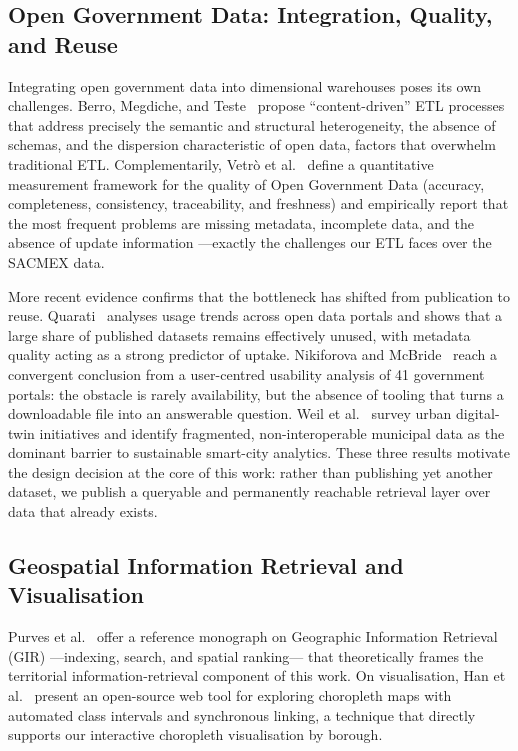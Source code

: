\documentclass[runningheads]{llncs}
\renewcommand{\_}{\origunderscore\allowbreak}
\newif\ifshowchanges
\newcommand{\new}[1]{\ifshowchanges\textcolor{chg}{#1}\else#1\fi}
\begin{document}
\subsection{Open Government Data: Integration, Quality, and Reuse}

Integrating open government data into dimensional warehouses poses its own
challenges. Berro, Megdiche, and Teste~\cite{berro2015} propose
``content-driven'' ETL processes that address precisely the semantic and
structural heterogeneity, the absence of schemas, and the dispersion
characteristic of open data, factors that overwhelm traditional ETL.
Complementarily, Vetr\`o et al.~\cite{vetro2016} define a quantitative
measurement framework for the quality of Open Government Data (accuracy,
completeness, consistency, traceability, and freshness) and empirically report
that the most frequent problems are missing metadata, incomplete data, and the
absence of update information ---exactly the challenges our ETL faces over the
SACMEX data.

\new{More recent evidence confirms that the bottleneck has shifted from
publication to reuse. Quarati~\cite{quarati2023} analyses usage trends across
open data portals and shows that a large share of published datasets remains
effectively unused, with metadata quality acting as a strong predictor of
uptake. Nikiforova and McBride~\cite{nikiforova2021} reach a convergent
conclusion from a user-centred usability analysis of 41 government portals: the
obstacle is rarely availability, but the absence of tooling that turns a
downloadable file into an answerable question. Weil et al.~\cite{weil2023}
survey urban digital-twin initiatives and identify fragmented, non-interoperable
municipal data as the dominant barrier to sustainable smart-city analytics.
These three results motivate the design decision at the core of this work:
rather than publishing yet another dataset, we publish a queryable and
permanently reachable retrieval layer over data that already exists.}

\subsection{Geospatial Information Retrieval and Visualisation}

Purves et al.~\cite{purves2018} offer a reference monograph on Geographic
Information Retrieval (GIR) ---indexing, search, and spatial ranking--- that
theoretically frames the territorial information-retrieval component of this
work. On visualisation, Han et al.~\cite{han2019} present an open-source web tool
for exploring choropleth maps with automated class intervals and synchronous
linking, a technique that directly supports our interactive choropleth
visualisation by borough.
\end{document}

